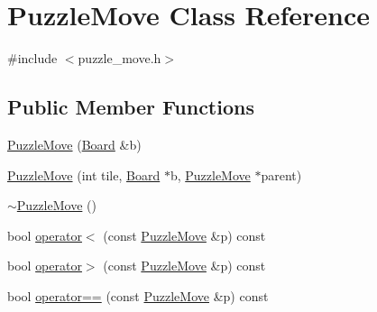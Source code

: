 \hypertarget{classPuzzleMove}{\section{\-Puzzle\-Move \-Class \-Reference}
\label{classPuzzleMove}
}


{\ttfamily \#include $<$puzzle\-\_\-move.\-h$>$}

\subsection*{\-Public \-Member \-Functions}
\begin{DoxyCompactItemize}
\item 
\hyperlink{classPuzzleMove_aab82684bd0bec53818b36ff1d38cd918}{\-Puzzle\-Move} (\hyperlink{classBoard}{\-Board} \&b)
\item 
\hyperlink{classPuzzleMove_a648f58dc747438872988d888b1b91c35}{\-Puzzle\-Move} (int tile, \hyperlink{classBoard}{\-Board} $\ast$b, \hyperlink{classPuzzleMove}{\-Puzzle\-Move} $\ast$parent)
\item 
\hyperlink{classPuzzleMove_af347f6552a12d3815aa3dfb264908c15}{$\sim$\-Puzzle\-Move} ()
\item 
bool \hyperlink{classPuzzleMove_a3b76cc463e70c40feed64915363c3dd9}{operator$<$} (const \hyperlink{classPuzzleMove}{\-Puzzle\-Move} \&p) const 
\item 
bool \hyperlink{classPuzzleMove_acdbbc19713741a1adf74e6886b52a6d7}{operator$>$} (const \hyperlink{classPuzzleMove}{\-Puzzle\-Move} \&p) const 
\item 
bool \hyperlink{classPuzzleMove_abd3fe605a9546d8ff7cc4609cef69761}{operator==} (const \hyperlink{classPuzzleMove}{\-Puzzle\-Move} \&p) const 
\end{DoxyCompactItemize}
